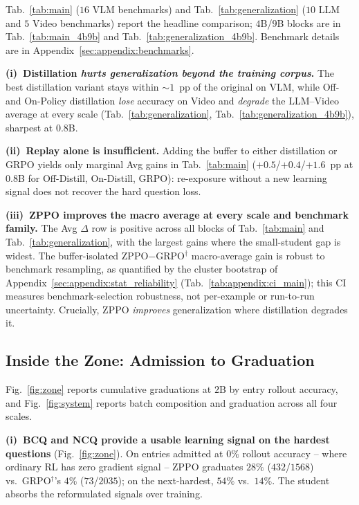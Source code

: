 Tab.~\ref{tab:main} ($16$ VLM benchmarks) and Tab.~\ref{tab:generalization} ($10$ LLM and $5$ Video benchmarks) report the headline comparison; $4$B/$9$B blocks are in Tab.~\ref{tab:main_4b9b} and Tab.~\ref{tab:generalization_4b9b}. Benchmark details are in Appendix~\ref{sec:appendix:benchmarks}.

\textbf{(i)~Distillation \emph{hurts generalization beyond the training corpus}.} The best distillation variant stays within $\sim$$1$~pp of the original on VLM, while Off- and On-Policy distillation \emph{lose} accuracy on Video and \emph{degrade} the LLM--Video average at every scale (Tab.~\ref{tab:generalization}, Tab.~\ref{tab:generalization_4b9b}), sharpest at $0.8$B.

\textbf{(ii)~Replay alone is insufficient.} Adding the buffer to either distillation or GRPO yields only marginal Avg gains in Tab.~\ref{tab:main} ($+0.5$/$+0.4$/$+1.6$~pp at $0.8$B for Off-Distill, On-Distill, GRPO): re-exposure without a new learning signal does not recover the hard question loss.

\textbf{(iii)~ZPPO improves the macro average at every scale and benchmark family.} The Avg $\Delta$ row is positive across all blocks of Tab.~\ref{tab:main} and Tab.~\ref{tab:generalization}, with the largest gains where the small-student gap is widest. The buffer-isolated ZPPO$-$GRPO$^{\dagger}$ macro-average gain is robust to benchmark resampling, as quantified by the cluster bootstrap of Appendix~\ref{sec:appendix:stat_reliability} (Tab.~\ref{tab:appendix:ci_main}); this CI measures benchmark-selection robustness, not per-example or run-to-run uncertainty. Crucially, ZPPO \emph{improves} generalization where distillation degrades it.

\subsection{Inside the Zone: Admission to Graduation}
\label{sec:experiments:zone}

Fig.~\ref{fig:zone} reports cumulative graduations at $2$B by entry rollout accuracy, and Fig.~\ref{fig:system} reports batch composition and graduation across all four scales.

\textbf{(i)~BCQ and NCQ provide a usable learning signal on the hardest questions} (Fig.~\ref{fig:zone}). On entries admitted at $0\%$ rollout accuracy -- where ordinary RL has zero gradient signal -- ZPPO graduates $28\%$ ($432$/$1568$) vs.\ GRPO$^{\dagger}$'s $4\%$ ($73$/$2035$); on the next-hardest, $54\%$ vs.\ $14\%$. The student absorbs the reformulated signals over training.

